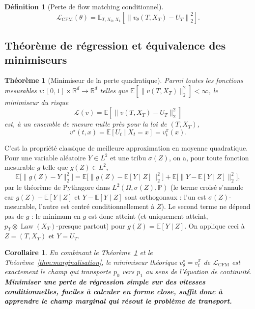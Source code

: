 \documentclass[11pt,a4paper]{article}
\makeatletter
\theoremstyle{definition}
\newtheorem{definition}{Définition}[section]
\theoremstyle{plain}
\newtheorem{theoreme}{Théorème}[section]
\newtheorem{corollaire}{Corollaire}[section]
\theoremstyle{remark}
\providecommand{\demonstrationname}{Démonstration}
\renewenvironment{proof}[1][\demonstrationname]{\par
  \pushQED{\qed}%
  \normalfont \topsep6\p@\@plus6\p@\relax
  \trivlist
  \item[\hskip\labelsep
        \bfseries #1\@addpunct{.}]\ignorespaces
}{%
  \popQED\endtrivlist\@endpefalse
}
\newcommand{\R}{\mathbb{R}}
\newcommand{\E}{\mathbb{E}}
\newcommand{\Prob}{\mathbb{P}}
\DeclareMathOperator{\Law}{Law}
\makeatother
\begin{document}
\begin{definition}[Perte de flow matching conditionnel]
\[
  \boxed{
  \mathcal{L}_{\mathrm{CFM}}(\theta)
  =
  \E_{T,X_0,X_1}\left[
  \left\|v_\theta(T,X_T)-U_T\right\|_2^2
  \right].
  }
\]
\end{definition}

\subsection{Théorème de régression et équivalence des minimiseurs}

\begin{theoreme}[Minimiseur de la perte quadratique]\label{thm:regression}
Parmi toutes les fonctions mesurables $v:[0,1]\times\R^d\to\R^d$ telles que
$\E[\|v(T,X_T)\|_2^2]<\infty$, le minimiseur du risque
\[
  \mathcal{L}(v) = \E\left[\|v(T,X_T)-U_T\|_2^2\right]
\]
est, à un ensemble de mesure nulle près pour la loi de $(T,X_T)$,
\[
  v^\star(t,x) = \E[U_t\mid X_t=x] = v_t^\pi(x).
\]
\end{theoreme}

\begin{proof}
C'est la propriété classique de meilleure approximation en moyenne quadratique.
Pour une variable aléatoire $Y\in L^2$ et une tribu $\sigma(Z)$, on a, pour toute
fonction mesurable $g$ telle que $g(Z)\in L^2$,
\[
  \E\bigl[\|g(Z)-Y\|_2^2\bigr]
  =
  \E\bigl[\|g(Z)-\E[Y\mid Z]\|_2^2\bigr]
  +
  \E\bigl[\|Y-\E[Y\mid Z]\|_2^2\bigr],
\]
par le théorème de Pythagore dans $L^2(\Omega,\sigma(Z),\Prob)$ (le terme croisé
s'annule car $g(Z)-\E[Y\mid Z]$ et $Y-\E[Y\mid Z]$ sont orthogonaux : l'un est
$\sigma(Z)$-mesurable, l'autre est centré conditionnellement à $Z$). Le second
terme ne dépend pas de $g$ : le minimum en $g$ est donc atteint (et uniquement
atteint, $p_T\otimes\Law(X_T)$-presque partout) pour $g(Z)=\E[Y\mid Z]$. On
applique ceci à $Z=(T,X_T)$ et $Y=U_T$.
\end{proof}

\begin{corollaire}
En combinant le Théorème~\ref{thm:regression} et le Théorème~\ref{thm:marginalisation},
le minimiseur théorique $v_\theta^\star=v_t^\pi$ de $\mathcal{L}_{\mathrm{CFM}}$
est exactement le champ qui transporte $p_0$ vers $p_1$ au sens de l'équation de
continuité. \textbf{Minimiser une perte de régression simple sur des vitesses
conditionnelles, faciles à calculer en forme close, suffit donc à apprendre le
champ marginal qui résout le problème de transport.}
\end{corollaire}
\end{document}
